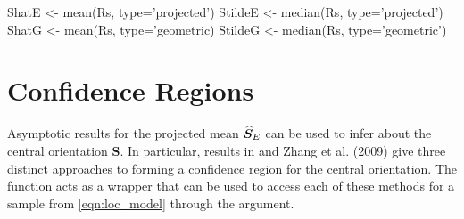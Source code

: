 \begin{example}
ShatE <- mean(Rs, type='projected')
StildeE <- median(Rs, type='projected')
ShatG <- mean(Rs, type='geometric)
StildeG <- median(Rs, type='geometric') 
\end{example}

%

\section{Confidence Regions}

Asymptotic results for the projected mean $\widehat{\bm S}_E$ can be used to infer about the central orientation $\bm S$. In particular, results in \cite{prentice1986,chang2001} and Zhang et al. (2009) give three distinct approaches to forming a confidence region for the central orientation.  The  function acts as a wrapper that can be used to access each of these methods for a sample from \eqref{eqn:loc_model} through the  argument.


